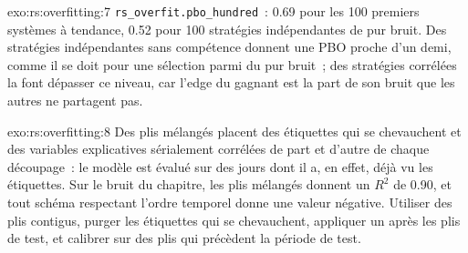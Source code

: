 \begin{solution}{exo:rs:overfitting:7}
\texttt{rs\_overfit.pbo\_hundred}~: 0.69 pour les 100 premiers systèmes à tendance, 0.52 pour 100 stratégies indépendantes de pur bruit. Des stratégies indépendantes sans compétence donnent une
PBO proche d'un demi, comme il se doit pour une sélection parmi du pur bruit~; des stratégies corrélées la font dépasser ce niveau, car l'edge du gagnant est la part de son bruit que les autres ne partagent pas.
\end{solution}

\begin{solution}{exo:rs:overfitting:8}
Des plis mélangés placent des étiquettes qui se chevauchent et des variables explicatives sérialement corrélées de part et d'autre de chaque découpage~: le modèle est évalué sur des jours dont il a, en
effet, déjà vu les étiquettes. Sur le bruit du chapitre, les plis mélangés donnent un $R^2$ de 0.90, et tout schéma respectant l'ordre temporel donne une valeur négative. Utiliser des plis contigus,
purger les étiquettes qui se chevauchent, appliquer un  après les plis de test, et calibrer sur des plis qui précèdent la période de test.
\end{solution}

